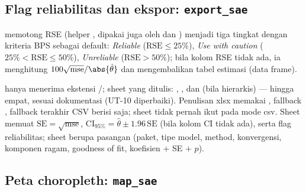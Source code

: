 \subsection{Flag reliabilitas dan ekspor: \texttt{export\_sae}}\label{sec:export}

 memotong RSE (helper ,
dipakai juga oleh  dan ) menjadi tiga tingkat
dengan kriteria BPS sebagai default: \emph{Reliable} ($\mathrm{RSE}\le25\%$),
\emph{Use with caution} ($25\%<\mathrm{RSE}\le50\%$), \emph{Unreliable}
($\mathrm{RSE}>50\%$); bila kolom RSE tidak ada, ia menghitung
$100\sqrt{\mathrm{mse}}/\abs{\hat\theta}$ dan mengembalikan tabel estimasi
(data frame). 

 hanya
menerima ekstensi /; sheet yang ditulis:
, ,  dan
 (bila hierarkis) --- hingga empat, sesuai
dokumentasi (UT-10 diperbaiki). Penulisan xlsx memakai
, fallback , fallback terakhir CSV berisi
 saja; sheet  tidak pernah ikut pada mode
csv. Sheet  memuat
$\mathrm{SE}=\sqrt{\mathrm{mse}}$, $\mathrm{CI}_{95\%}=\hat\theta\pm1.96\,\mathrm{SE}$
(bila kolom CI tidak ada), serta flag reliabilitas; sheet
 berupa pasangan  (paket, tipe
model, method, konvergensi, komponen ragam, goodness of fit, koefisien
$+$ SE $+$ $p$).

\subsection{Peta choropleth: \texttt{map\_sae}}\label{sec:map}

